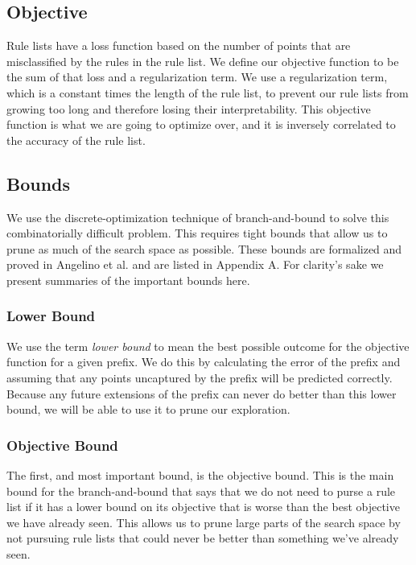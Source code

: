 \documentclass[]{article}
\theoremstyle{definition}
\begin{document}
\subsection{Objective}
Rule lists have a loss function based on the number of points that are misclassified by the rules in the rule list.
We define our objective function to be the sum of that loss and a regularization term.
We use a regularization term, which is a constant times the length of the rule list, to prevent our rule lists from growing too long and therefore losing their interpretability.
This objective function is what we are going to optimize over, and it is inversely correlated to the accuracy of the rule list. 

\subsection{Bounds}
We use the discrete-optimization technique of branch-and-bound to solve this combinatorially difficult problem.
This requires tight bounds that allow us to prune as much of the search space as possible.
These bounds are formalized and proved in Angelino et al. \cite{AngelinoLaAlSeRu17} and are listed in Appendix A.
For clarity's sake we present summaries of the important bounds here.

\subsubsection{Lower Bound}
We use the term \textit{lower bound} to mean the best possible outcome for the objective function for a given prefix.
We do this by calculating the error of the prefix and assuming that any points uncaptured by the prefix will be predicted correctly.
Because any future extensions of the prefix can never do better than this lower bound, we will be able to use it to prune our exploration.

\subsubsection{Objective Bound}
The first, and most important bound, is the objective bound.
This is the main bound for the branch-and-bound that says that we do not need to purse a rule list if it has a lower bound on its objective that is worse than the best objective we have already seen.
This allows us to prune large parts of the search space by not pursuing rule lists that could never be better than something we've already seen.
\end{document}
